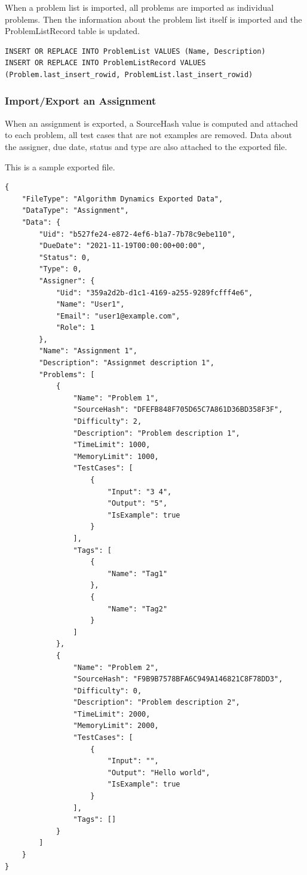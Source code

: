 \documentclass[a4paper]{report}
\begin{document}
When a problem list is imported, all problems are imported as individual problems. Then the information about the problem list itself is imported and the ProblemListRecord table is updated.

\begin{verbatim}
INSERT OR REPLACE INTO ProblemList VALUES (Name, Description)
INSERT OR REPLACE INTO ProblemListRecord VALUES (Problem.last_insert_rowid, ProblemList.last_insert_rowid)
\end{verbatim}

\subsubsection{Import/Export an Assignment}

When an assignment is exported, a SourceHash value is computed and attached to each problem, all test cases that are not examples are removed. Data about the assigner, due date, status and type are also attached to the exported file.

This is a sample exported file.

\begin{verbatim}
{
    "FileType": "Algorithm Dynamics Exported Data",
    "DataType": "Assignment",
    "Data": {
        "Uid": "b527fe24-e872-4ef6-b1a7-7b78c9ebe110",
        "DueDate": "2021-11-19T00:00:00+00:00",
        "Status": 0,
        "Type": 0,
        "Assigner": {
            "Uid": "359a2d2b-d1c1-4169-a255-9289fcfff4e6",
            "Name": "User1",
            "Email": "user1@example.com",
            "Role": 1
        },
        "Name": "Assignment 1",
        "Description": "Assignmet description 1",
        "Problems": [
            {
                "Name": "Problem 1",
                "SourceHash": "DFEFB848F705D65C7A861D36BD358F3F",
                "Difficulty": 2,
                "Description": "Problem description 1",
                "TimeLimit": 1000,
                "MemoryLimit": 1000,
                "TestCases": [
                    {
                        "Input": "3 4",
                        "Output": "5",
                        "IsExample": true
                    }
                ],
                "Tags": [
                    {
                        "Name": "Tag1"
                    },
                    {
                        "Name": "Tag2"
                    }
                ]
            },
            {
                "Name": "Problem 2",
                "SourceHash": "F9B9B7578BFA6C949A146821C8F78DD3",
                "Difficulty": 0,
                "Description": "Problem description 2",
                "TimeLimit": 2000,
                "MemoryLimit": 2000,
                "TestCases": [
                    {
                        "Input": "",
                        "Output": "Hello world",
                        "IsExample": true
                    }
                ],
                "Tags": []
            }
        ]
    }
}
\end{verbatim}
\end{document}
